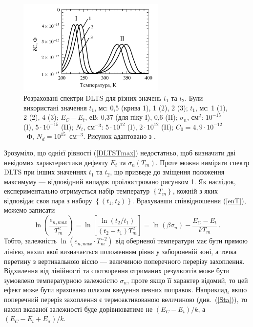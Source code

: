\documentclass[10pt,a5paper,titlepage,oneside]{book}
\numberwithin{equation}{part}
\begin{document}
\begin{figure}[!b]
\center
\vspace{-5mm}
\includegraphics[width=0.65\textwidth]{Fig2_4}
\vspace{-3mm}
\caption{Розраховані спектри DLTS для різних значень $t_1$ та $t_2$.
Були використані значення 
$t_1$, мс: 0,5 (крива 1), 1 (2), 2 (3);
$t_1$, мс: 1 (1), 2 (2), 4 (3);
$E_C-E_t$, еВ: 0,37 (для піку I), 0,6 (II);
$\sigma_n$, см$^2$: $10^{-15}$ (I), $5\cdot10^{-15}$ (II);
$N_t$, см$^{-3}$: $5\cdot10^{12}$ (I), $2\cdot10^{12}$ (II);
$C_0=4,9\cdot10^{-12}$~Ф, $N_d=10^{15}$~см$^{-3}$.
Рисунок адаптовано з \cite{Schroder2006}.
}
\vspace{-3mm}
\label{F24}
\end{figure}


Зрозуміло, що однієї рівності (\ref{DLTSTmax}) недостатньо,
щоб визначити дві невідомих характеристики дефекту $E_t$ та $\sigma_n(T_m)$.
Проте можна виміряти спектр DLTS при інших значеннях $t_1$ та $t_2$,
що призведе до зміщення положення максимуму --- відповідний випадок проілюстровано рисунком \ref{F24}.
Як наслідок, експериментально отримується набір температур $\left\{T_{m}\right\}$,
кожній з яких відповідає своя пара з набору  $\left\{(t_{1},t_{2})\right\}$.
Врахувавши співвідношення (\ref{enT}), можемо записати
\begin{equation}
\label{DLTSenT}
\ln\left(\frac{e_{n,max}}{T_m^2}\right)=\ln\left[\frac{\ln\left(t_2/t_1\right)}{\left(t_2-t_1\right)T_m^2}\right]=\ln\left(\beta\sigma_n\right)-\frac{E_C-E_t}{kT_m}\,.
\end{equation}
Тобто, залежність $\ln(e_{n,max}\cdot T_m^{-2})$ від оберненої температури має бути прямою лінією,
нахил якої визначається положенням рівня у забороненій зоні, а точка перетину з вертикальною віссю ---
величиною поперечного перерізу захоплення.
Відхилення від лінійності та спотворення отриманих результатів може бути зумовлено температурною залежністю
$\sigma_n$, проте якщо її характер відомий, то цей ефект може бути враховано шляхом введення певних поправок.
Наприклад, якщо поперечний переріз захоплення є термоактивованою величиною (див.~(\ref{Sta})),
то нахил вказаної залежності буде дорівнюватиме не $(E_C-E_t)/k$, а $(E_C-E_t+E_{\sigma})/k$.
\end{document}

